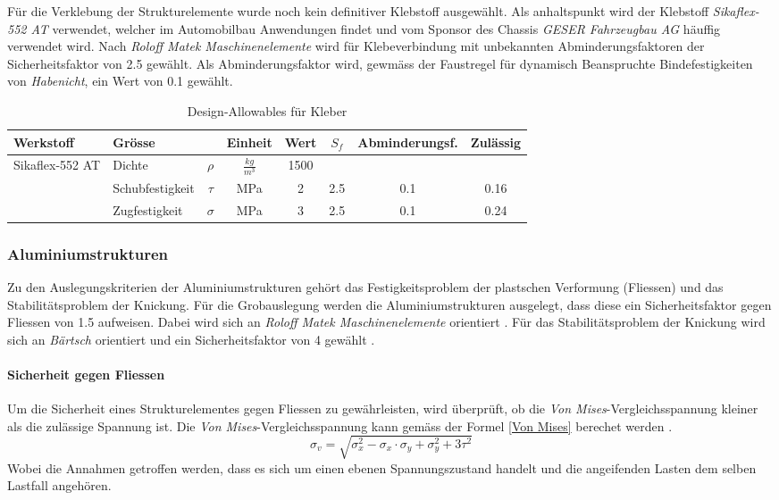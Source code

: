   Für die Verklebung der Strukturelemente wurde noch kein definitiver Klebstoff ausgewählt. Als anhaltspunkt wird der Klebstoff \emph{Sikaflex-552 AT} verwendet, welcher im Automobilbau Anwendungen findet und vom Sponsor des Chassis \emph{GESER Fahrzeugbau AG} häuffig verwendet wird. Nach \emph{Roloff Matek Maschinenelemente} wird für Klebeverbindung mit unbekannten Abminderungsfaktoren der Sicherheitsfaktor von 2.5 gewählt. Als Abminderungsfaktor wird, gewmäss der Faustregel für dynamisch Beanspruchte Bindefestigkeiten von \emph{Habenicht}\cite{kleben1}, ein Wert von 0.1 gewählt.
  \begin{table}[H]
    \centering
    \caption{Design-Allowables für Kleber}
    \begin{tabular}{llcccccc}	\hline
      Werkstoff	&	Grösse	&		&	Einheit	&	Wert	&	$S_f$	&	Abminderungsf.&	Zulässig	\\	\hline
      \multirow{3}{*}{Sikaflex-552 AT}	&	Dichte	&	$\rho$        	&	$\frac{kg}{m^3}$	&	1500	&		&		&		\\
      	&	Schubfestigkeit	&	$\tau$	&	MPa	&	2	&	2.5	&	0.1	&	0.16	\\
      	&	Zugfestigkeit	&	$\sigma$      	&	MPa	&	3	&	2.5	&	0.1	&	0.24	\\	\hline
    \end{tabular}
    \label{tab:Design-Allowables Kleben}
  \end{table}




  \subsubsection{Aluminiumstrukturen}
  Zu den Auslegungskriterien der Aluminiumstrukturen gehört das Festigkeitsproblem der plastschen Verformung (Fliessen) und das Stabilitätsproblem der Knickung. Für die Grobauslegung werden die Aluminiumstrukturen ausgelegt, dass diese ein Sicherheitsfaktor gegen Fliessen von 1.5 aufweisen. Dabei wird sich an \emph{Roloff Matek Maschinenelemente} orientiert \cite{Roloff}. Für das Stabilitätsproblem der Knickung wird sich an \emph{Bärtsch} orientiert und ein Sicherheitsfaktor von 4 gewählt \cite{Baertsch}.

  \paragraph{Sicherheit gegen Fliessen}
  Um die Sicherheit eines Strukturelementes gegen Fliessen zu gewährleisten, wird überprüft, ob die \emph{Von Mises}-Vergleichsspannung kleiner als die zulässige Spannung ist. Die \emph{Von Mises}-Vergleichsspannung kann gemäss der Formel \ref{Von Mises} berechet werden \cite{Baertsch}.
  \begin{equation}
    \label{Von Mises}
    \sigma_v = \sqrt{\sigma_x^{2}-\sigma_x \cdot \sigma_y + \sigma_y^2 + 3\tau^2}
  \end{equation}
  Wobei die Annahmen getroffen werden, dass es sich um einen ebenen Spannungszustand handelt und die angeifenden Lasten dem selben Lastfall angehören.

